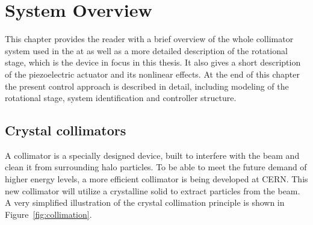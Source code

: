 \chapter{System Overview}\label{cha:systemOverview}
This chapter provides the reader with a brief overview of the whole collimator system used in the \abbrLHC at \abbrCERN as well as a more detailed description of the rotational stage, which is the device in focus in this thesis. It also gives a short description of the piezoelectric actuator and its nonlinear effects. At the end of this chapter the present control approach is described in detail, including modeling of the rotational stage, system identification and controller structure.

\section{Crystal collimators}
A collimator is a specially designed device, built to interfere with the beam and clean it from surrounding halo particles. To be able to meet the future demand of higher energy levels, a more efficient collimator is being developed at CERN. This new collimator will utilize a crystalline solid to extract particles from the beam. A very simplified illustration of the crystal collimation principle is shown in Figure~\ref{fig:collimation}.

